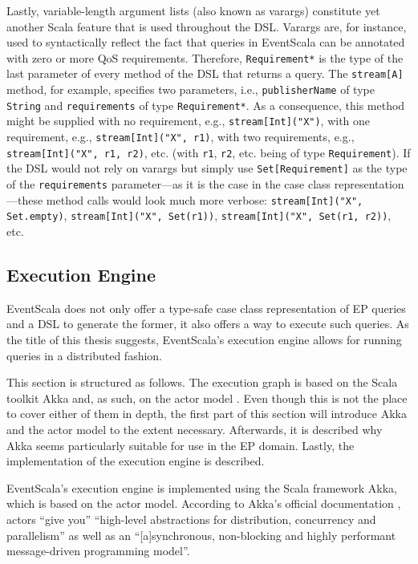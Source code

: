 \documentclass[article, 10pt, type=bsc, colorback, accentcolor=tud8b, parskip=half, bibliography=totocnumbered]{tudthesis}
\begin{document}
Lastly, variable-length argument lists (also known as varargs) constitute yet another Scala feature that is used throughout the DSL.
Varargs are, for instance, used to syntactically reflect the fact that queries in EventScala can be annotated with zero or more QoS requirements.
Therefore, \lstinline{Requirement*} is the type of the last parameter of every method of the DSL that returns a query.
The \lstinline{stream[A]} method, for example, specifies two parameters, i.e., \lstinline{publisherName} of type \lstinline{String} and \lstinline{requirements} of type \lstinline{Requirement*}.
As a consequence, this method might be supplied with no requirement, e.g., \lstinline{stream[Int]("X")}, with one requirement, e.g., \lstinline{stream[Int]("X", r1)}, with two requirements, e.g., \lstinline{stream[Int]("X", r1, r2)}, etc. (with \lstinline{r1}, \lstinline{r2}, etc. being of type \lstinline{Requirement}).
If the DSL would not rely on varargs but simply use \lstinline{Set[Requirement]} as the type of the \lstinline{requirements} parameter---as it is the case in the case class representation---these method calls would look much more verbose:
\lstinline{stream[Int]("X", Set.empty)}, \lstinline{stream[Int]("X", Set(r1))}, \lstinline{stream[Int]("X", Set(r1, r2))}, etc.

\subsection{Execution Engine}
\label{sec:execution_engine}

EventScala does not only offer a type-safe case class representation of EP queries and a DSL to generate the former, it also offers a way to execute such queries. As the title of this thesis suggests, EventScala's execution engine allows for running queries in a distributed fashion.

This section is structured as follows.
The execution graph is based on the Scala toolkit Akka \cite{akka} and, as such, on the actor model \cite{Hewitt:1973:UMA:1624775.1624804}.
Even though this is not the place to cover either of them in depth, the first part of this section will introduce Akka and the actor model to the extent necessary.
Afterwards, it is described why Akka seems particularly suitable for use in the EP domain.
Lastly, the implementation of the execution engine is described.

EventScala's execution engine is implemented using the Scala framework Akka, which is based on the actor model.
According to Akka's official documentation \cite{akkadoc}, actors ``give you'' ``high-level abstractions for distribution, concurrency and parallelism'' as well as an ``[a]synchronous, non-blocking and highly performant message-driven programming model''.
\end{document}
